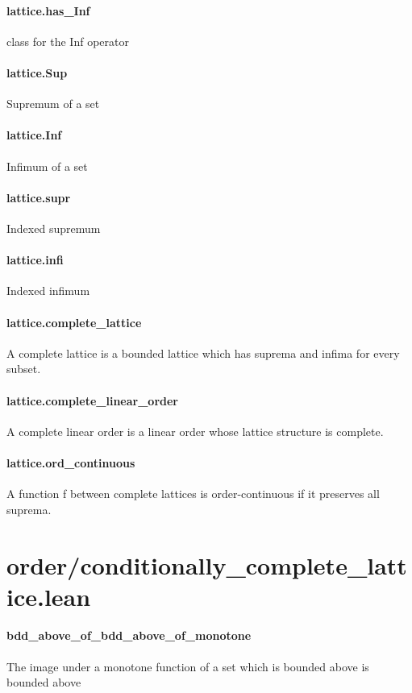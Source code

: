 \documentclass{article}
\begin{document}
\paragraph{lattice.has\_Inf}
\par
class for the 
\colorbox[RGB]{253,246,227}{{{{\color[RGB]{101, 123, 131} Inf }}}} operator
\paragraph{lattice.Sup}
\par
Supremum of a set
\paragraph{lattice.Inf}
\par
Infimum of a set
\paragraph{lattice.supr}
\par
Indexed supremum
\paragraph{lattice.infi}
\par
Indexed infimum
\paragraph{lattice.complete\_lattice}
\par
A complete lattice is a bounded lattice which
has suprema and infima for every subset.
\paragraph{lattice.complete\_linear\_order}
\par
A complete linear order is a linear order whose lattice structure is complete.
\paragraph{lattice.ord\_continuous}
\par
A function 
\colorbox[RGB]{253,246,227}{{{{\color[RGB]{101, 123, 131} f }}}} between complete lattices is order-continuous
if it preserves all suprema.
\section{order/conditionally\_complete\_lattice.lean}\paragraph{bdd\_above\_of\_bdd\_above\_of\_monotone}
\par
The image under a monotone function of a set which is bounded above is bounded above
\end{document}
